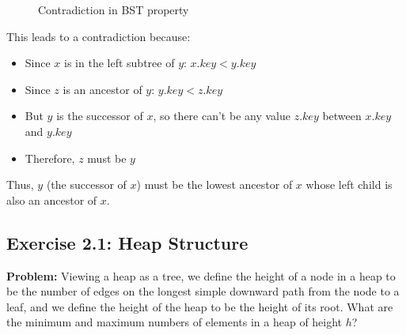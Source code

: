 \begin{figure}[H]
    \centering
    \caption*{\footnotesize Contradiction in BST property}
\end{figure}

This leads to a contradiction because:
\begin{itemize}
    \item Since $x$ is in the left subtree of $y$: $x.key < y.key$
    \item Since $z$ is an ancestor of $y$: $y.key < z.key$
    \item But $y$ is the successor of $x$, so there can't be any value $z.key$ between $x.key$ and $y.key$
    \item Therefore, $z$ must be $y$
\end{itemize}

Thus, $y$ (the successor of $x$) must be the lowest ancestor of $x$ whose left child is also an ancestor of $x$.

\subsection{Exercise 2.1: Heap Structure}
\textbf{Problem:} Viewing a heap as a tree, we define the height of a node in a heap to be the number of edges on the longest simple downward path from the node to a leaf, and we define the height of the heap to be the height of its root. What are the minimum and maximum numbers of elements in a heap of height $h$?

